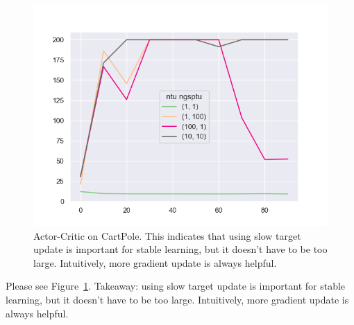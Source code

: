 \begin{figure}[htbp]
    \centering
    \includegraphics[width=0.5\linewidth]{figures/q4.png}
    \caption{Actor-Critic on CartPole. This indicates that using slow target update is important for stable learning, but it doesn't have to be too large. Intuitively, more gradient update is always helpful.}
    \label{fig:q4}
\end{figure}

Please see Figure~\ref{fig:q4}. Takeaway: using slow target update is important for stable learning, but it doesn't have to be too large. Intuitively, more gradient update is always helpful.
